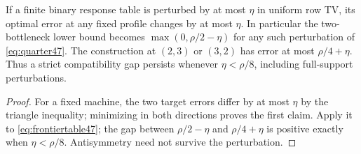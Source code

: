 \begin{corollary}\label{cor:stable47}
If a finite binary response table is perturbed by at most $\eta$ in
uniform row TV, its optimal error at any fixed profile changes by at
most $\eta$. In particular the two-bottleneck lower bound becomes
$\max(0,\rho/2-\eta)$ for any such perturbation of
\eqref{eq:quarter47}. The construction at $(2,3)$ or $(3,2)$ has
error at most $\rho/4+\eta$. Thus a strict compatibility gap persists
whenever $\eta<\rho/8$, including full-support perturbations.
\end{corollary}
\begin{proof}
For a fixed machine, the two target errors differ by at most $\eta$
by the triangle inequality; minimizing in both directions proves the
first claim. Apply it to \eqref{eq:frontiertable47}; the gap between
$\rho/2-\eta$ and $\rho/4+\eta$ is positive exactly when
$\eta<\rho/8$. Antisymmetry need not survive the perturbation.
\end{proof}

